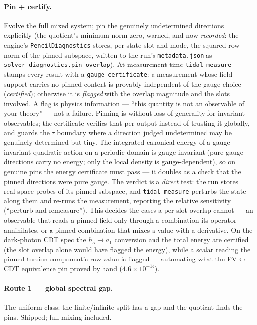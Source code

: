 \paragraph{Pin + certify.} Evolve the full mixed system; pin the
genuinely undetermined directions explicitly (the quotient's
minimum-norm zero, warned, and now \emph{recorded}: the engine's
\texttt{PencilDiagnostics} stores, per state slot and mode, the squared
row norm of the pinned subspace, written to the run's
\texttt{metadata.json} as \texttt{solver\_diagnostics.pin\_overlap}). At
measurement time \texttt{tidal measure} stamps every result with a
\texttt{gauge\_certificate}: a measurement whose field support carries no
pinned content is provably independent of the gauge choice
(\emph{certified}); otherwise it is \emph{flagged} with the overlap
magnitude and the slots involved. A flag is physics information ---
``this quantity is not an observable of your theory'' --- not a
failure. Pinning is without loss of generality for invariant
observables; the certificate verifies that per output instead of
trusting it globally, and guards the $\tau$ boundary where a direction
judged undetermined may be genuinely determined but tiny. The integrated
canonical energy of a gauge-invariant quadratic action on a periodic
domain is gauge-invariant (pure-gauge directions carry no energy; only
the local density is gauge-dependent), so on genuine pins the energy
certificate must pass --- it doubles as a check that the pinned
directions were pure gauge. The verdict is a \emph{direct} test: the
run stores real-space probes of its pinned subspace, and
\texttt{tidal measure} perturbs the state along them and re-runs the
measurement, reporting the relative sensitivity (``perturb and
remeasure''). This decides the cases a per-slot overlap cannot --- an
observable that reads a pinned field only through a combination its
operator annihilates, or a pinned combination that mixes a value with a
derivative. On the dark-photon CDT spec the $h_5 \to a_1$ conversion
and the total energy are certified (the slot overlap alone would have
flagged the energy), while a scalar reading the pinned torsion
component's raw value is flagged --- automating what the
FV$\leftrightarrow$CDT equivalence pin proved by hand
($4.6\times10^{-14}$).

\paragraph{Route 1 --- global spectral gap.} The uniform class: the
finite/infinite split has a gap and the quotient finds the pins.
Shipped; full mixing included.

